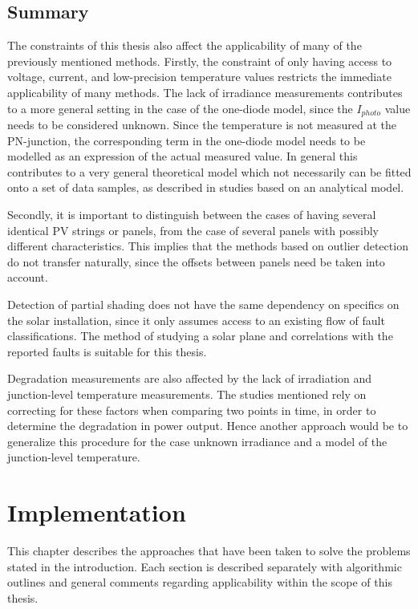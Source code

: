 \section{Summary}
The constraints of this thesis also affect the applicability of many of the previously mentioned methods.
Firstly, the constraint of only having access to voltage, current, and low-precision temperature values restricts the immediate applicability of many methods.
The lack of irradiance measurements contributes to a more general setting in the case of the one-diode model, since the $I_{photo}$ value needs to be considered unknown.
Since the temperature is not measured at the PN-junction, the corresponding term in the one-diode model needs to be modelled as an expression of the actual measured value.
In general this contributes to a very general theoretical model which not necessarily can be fitted onto a set of data samples, as described in studies based on an analytical model.

Secondly, it is important to distinguish between the cases of having several identical PV strings or panels, from the case of several panels with possibly different characteristics.
This implies that the methods based on outlier detection do not transfer naturally, since the offsets between panels need be taken into account.

Detection of partial shading does not have the same dependency on specifics on the solar installation, since it only assumes access to an existing flow of fault classifications.
The method of studying a solar plane and correlations with the reported faults is suitable for this thesis.

Degradation measurements are also affected by the lack of irradiation and junction-level temperature measurements.
The studies mentioned rely on correcting for these factors when comparing two points in time, in order to determine the degradation in power output.
Hence another approach would be to generalize this procedure for the case unknown irradiance and a model of the junction-level temperature.

\chapter{Implementation}
This chapter describes the approaches that have been taken to solve the problems stated in the introduction.
Each section is described separately with algorithmic outlines and general comments regarding applicability within the scope of this thesis.

